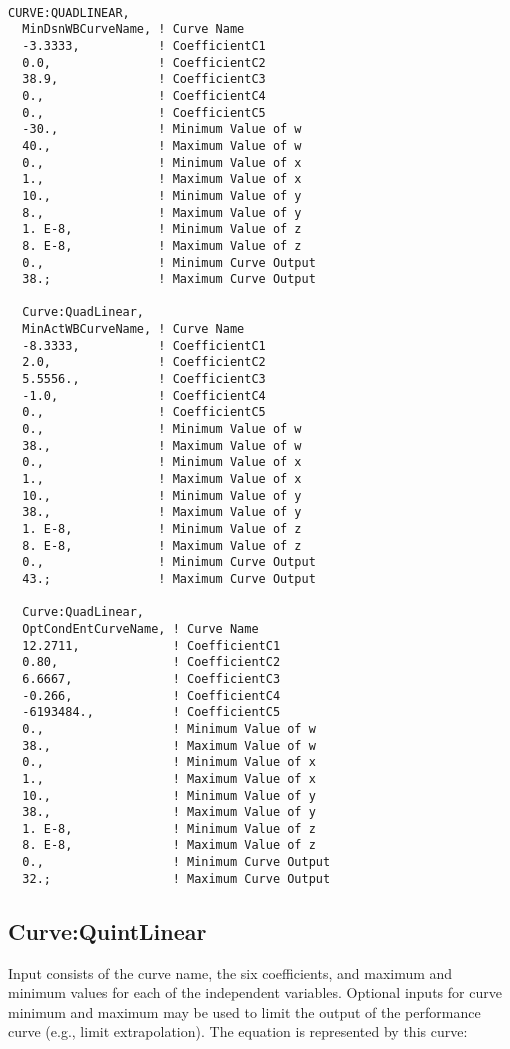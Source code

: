 \begin{lstlisting}

CURVE:QUADLINEAR,
  MinDsnWBCurveName, ! Curve Name
  -3.3333,           ! CoefficientC1
  0.0,               ! CoefficientC2
  38.9,              ! CoefficientC3
  0.,                ! CoefficientC4
  0.,                ! CoefficientC5
  -30.,              ! Minimum Value of w
  40.,               ! Maximum Value of w
  0.,                ! Minimum Value of x
  1.,                ! Maximum Value of x
  10.,               ! Minimum Value of y
  8.,                ! Maximum Value of y
  1. E-8,            ! Minimum Value of z
  8. E-8,            ! Maximum Value of z
  0.,                ! Minimum Curve Output
  38.;               ! Maximum Curve Output

  Curve:QuadLinear,
  MinActWBCurveName, ! Curve Name
  -8.3333,           ! CoefficientC1
  2.0,               ! CoefficientC2
  5.5556.,           ! CoefficientC3
  -1.0,              ! CoefficientC4
  0.,                ! CoefficientC5
  0.,                ! Minimum Value of w
  38.,               ! Maximum Value of w
  0.,                ! Minimum Value of x
  1.,                ! Maximum Value of x
  10.,               ! Minimum Value of y
  38.,               ! Maximum Value of y
  1. E-8,            ! Minimum Value of z
  8. E-8,            ! Maximum Value of z
  0.,                ! Minimum Curve Output
  43.;               ! Maximum Curve Output

  Curve:QuadLinear,
  OptCondEntCurveName, ! Curve Name
  12.2711,             ! CoefficientC1
  0.80,                ! CoefficientC2
  6.6667,              ! CoefficientC3
  -0.266,              ! CoefficientC4
  -6193484.,           ! CoefficientC5
  0.,                  ! Minimum Value of w
  38.,                 ! Maximum Value of w
  0.,                  ! Minimum Value of x
  1.,                  ! Maximum Value of x
  10.,                 ! Minimum Value of y
  38.,                 ! Maximum Value of y
  1. E-8,              ! Minimum Value of z
  8. E-8,              ! Maximum Value of z
  0.,                  ! Minimum Curve Output
  32.;                 ! Maximum Curve Output
\end{lstlisting}

\subsection{Curve:QuintLinear}\label{curvequintlinear}

Input consists of the curve name, the six coefficients, and maximum and minimum values for each of the independent variables. Optional inputs for curve minimum and maximum may be used to limit the output of the performance curve (e.g., limit extrapolation). The equation is represented by this curve:

